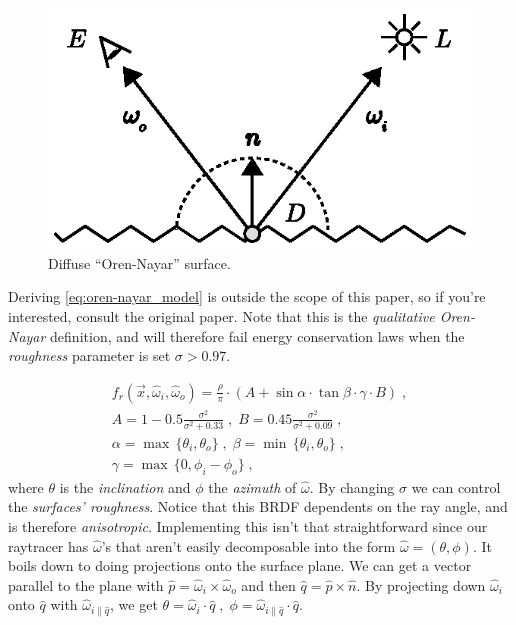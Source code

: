 \documentclass[a4paper, twocolumn]{article}
\begin{document}
                \begin{figure}[H]
                    \centering
                    \includegraphics[width=0.8\linewidth]{share/oren-nayar_model.eps}
                    \caption{Diffuse ``Oren-Nayar'' surface.}
                    \label{fig:oren-nayar_model}
                \end{figure}

                Deriving \cref{eq:oren-nayar_model} is outside the scope of this paper, so if you're interested, consult the original paper. Note that this is the \emph{qualitative Oren-Nayar} definition, and will therefore fail energy conservation laws when the \emph{roughness} parameter is set \(\sigma > 0.97\).

                \begin{equation} \label{eq:oren-nayar_model}
                    \begin{split}
                        f_r(\vec{x}, \hat{\omega}_i, \hat{\omega}_o) = \frac{\rho}{\pi} \cdot (A + \sin\alpha \cdot \tan\beta \cdot \gamma \cdot B) \; ,\\
                        A = 1 - 0.5 \frac{\sigma^2}{\sigma^2 + 0.33} \; , \; B = 0.45\frac{\sigma^2}{\sigma^2 + 0.09} \; ,\\
                        \alpha = \max\, \{\theta_i, \theta_o\} \; , \; \beta = \min\, \{\theta_i, \theta_o\} \; ,\\
                        \gamma = \max\, \{0, \phi_i - \phi_o\} \; ,
                    \end{split}
                \end{equation} where \(\theta\) is the \emph{inclination} and \(\phi\) the \emph{azimuth} of \(\hat{\omega}\). By changing \(\sigma\) we can control the \emph{surfaces' roughness}. Notice that this BRDF dependents on the ray angle, and is therefore \emph{anisotropic}. Implementing this isn't that straightforward since our raytracer has \(\hat{\omega}\)'s that aren't easily decomposable into the form \(\hat{\omega} = (\theta, \phi)\). It boils down to doing projections onto the surface plane. We can get a vector parallel to the plane with \(\hat{p} = \hat{\omega}_i \times \hat{\omega}_o\) and then \(\hat{q} = \hat{p} \times \hat{n}\). By projecting down \(\hat{\omega}_i\) onto \(\hat{q}\) with \(\hat{\omega}_{i\parallel \hat{q}}\), we get \(\theta = \hat{\omega}_i \cdot \hat{q} \; , \; \phi = \hat{\omega}_{i\parallel \hat{q}} \cdot \hat{q}\).
\end{document}
